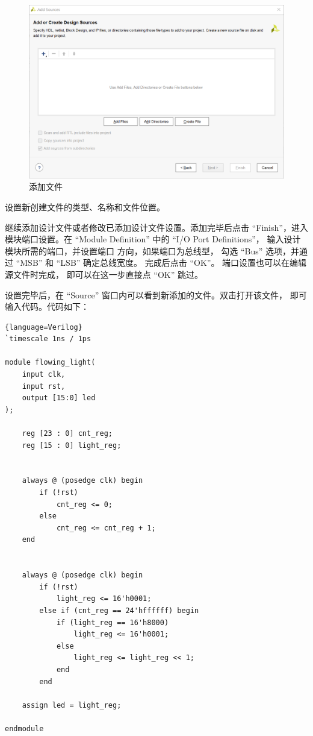 \documentclass[ichigo,normal,cn]{elegantnote_mod}
\begin{document}
\begin{figure}[!htbp]
    \centering
    \includegraphics[width=.8\textwidth]{fig/AddSource2}
    \caption{添加文件}
    \label{fig:AddSource2}
\end{figure}

设置新创建文件的类型、名称和文件位置。

\begin{center}
\end{center}

继续添加设计文件或者修改已添加设计文件设置。添加完毕后点击 “Finish”，进入
模块端口设置。在 “Module Definition” 中的 “I/O Port Definitions”，
输入设计模块所需的端口，并设置端口 方向，如果端口为总线型，
勾选 “Bus” 选项，并通过 “MSB” 和 “LSB” 确定总线宽度。
完成后点击 “OK”。 端口设置也可以在编辑源文件时完成，
即可以在这一步直接点 “OK” 跳过。

设置完毕后，在 “Source” 窗口内可以看到新添加的文件。双击打开该文件，
即可输入代码。代码如下：

\begin{lstlisting}{language=Verilog}
`timescale 1ns / 1ps 

module flowing_light(
	input clk,
	input rst,
	output [15:0] led
);
 
    reg [23 : 0] cnt_reg;
	reg [15 : 0] light_reg; 
 
 
    always @ (posedge clk) begin
		if (!rst)
			cnt_reg <= 0;
		else
			cnt_reg <= cnt_reg + 1;
	end 
 
 
    always @ (posedge clk) begin
		if (!rst)
			light_reg <= 16'h0001;
		else if (cnt_reg == 24'hffffff) begin
			if (light_reg == 16'h8000)
				light_reg <= 16'h0001; 
            else
				light_reg <= light_reg << 1;
			end
		end
		
	assign led = light_reg;
	
endmodule
\end{lstlisting}
\end{document}

